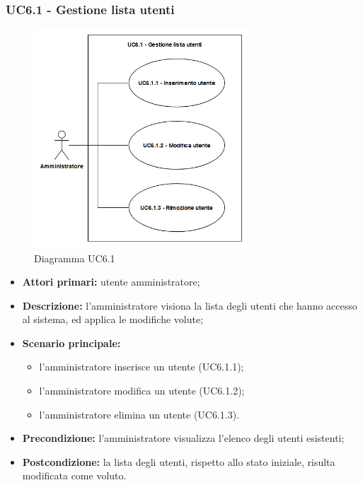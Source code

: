 \subsubsection{UC6.1 - Gestione lista utenti}
	\begin{center}
		\begin{figure}[h!]
			\includegraphics[width=8cm]{images/uc6.1.png}
			\caption{Diagramma UC6.1}
		\end{figure}
	\end{center}
	\begin{itemize}
		\item \textbf{Attori primari:} utente amministratore;
		\item \textbf{Descrizione:} l'amministratore visiona la lista degli utenti che hanno accesso al sistema, ed applica le modifiche volute;
		\item \textbf{Scenario principale:} 
			\begin{itemize}
				\item l'amministratore inserisce un utente (UC6.1.1);
				\item l'amministratore modifica un utente (UC6.1.2);
				\item l'amministratore elimina un utente (UC6.1.3).
			\end{itemize}
		\item \textbf{Precondizione:} l'amministratore visualizza l'elenco degli utenti esistenti;
		\item \textbf{Postcondizione:} la lista degli utenti, rispetto allo stato iniziale, risulta modificata come voluto.
	\end{itemize}

